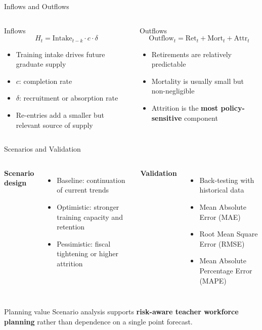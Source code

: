 \documentclass[
  11pt,
  ignorenonframetext,
  aspectratio=169,
  11pt]{beamer}
\newcommand{\highlight}[1]{\textcolor{DavidsonBlueDark}{\textbf{#1}}}
\newcommand{\gold}[1]{\textcolor{AccentGold}{\textbf{#1}}}
\begin{document}
\begin{frame}{Inflows and Outflows}
\begin{columns}[T,onlytextwidth]
\begin{block}{Inflows}
\[
H_t = \mathrm{Intake}_{t-k}\cdot c \cdot \delta
\]
\begin{itemize}
  \item Training intake drives future graduate supply
  \item $c$: completion rate
  \item $\delta$: recruitment or absorption rate
  \item Re-entries add a smaller but relevant source of supply
\end{itemize}
\end{block}
\begin{block}{Outflows}
\[
\mathrm{Outflow}_t = \mathrm{Ret}_t + \mathrm{Mort}_t + \mathrm{Attr}_t
\]
\begin{itemize}
  \item Retirements are relatively predictable
  \item Mortality is usually small but non-negligible
  \item Attrition is the \gold{most policy-sensitive} component
\end{itemize}
\end{block}
\end{columns}
\end{frame}

\begin{frame}{Scenarios and Validation}
\begin{columns}[T,onlytextwidth]
\textbf{Scenario design}
\begin{itemize}
  \item Baseline: continuation of current trends
  \item Optimistic: stronger training capacity and retention
  \item Pessimistic: fiscal tightening or higher attrition
\end{itemize}
\textbf{Validation}
\begin{itemize}
  \item Back-testing with historical data
  \item Mean Absolute Error (MAE)
  \item Root Mean Square Error (RMSE)
  \item Mean Absolute Percentage Error (MAPE)
\end{itemize}
\end{columns}
\vspace{0.2cm}
\begin{block}{Planning value}
Scenario analysis supports \highlight{risk-aware teacher workforce planning} rather than dependence on a single point forecast.
\end{block}
\end{frame}
\end{document}
